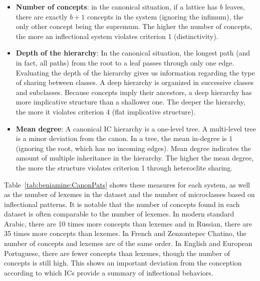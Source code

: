 \documentclass[output=paper]{langscibook}
\begin{document}
    \begin{itemize}
        \item \textbf{Number of concepts}: in the canonical situation, if a lattice has $b$ leaves, there are exactly $b+1$ concepts in the system (ignoring the infimum), the only other concept being the supremum. The higher the number of concepts, the more an inflectional system violates criterion 1 (distinctivity).
        \item \textbf{Depth of the hierarchy}: In the canonical situation, the longest path (and in fact, all paths) from the root to a leaf passes through only one edge. Evaluating the depth of the hierarchy gives us information regarding the type of sharing between classes. A deep hierarchy is organized in successive classes and subclasses. Because concepts imply their ancestors, a deep hierarchy has more implicative structure than a shallower one. The deeper the hierarchy, the more it violates criterion 4 (flat implicative structure). 
        \item \textbf{Mean degree}: A canonical IC hierarchy is a one-level tree. A multi-level tree is a minor deviation from the canon. In a tree, the mean in-degree is $1$ (ignoring the root, which has no incoming edges). Mean degree indicates the amount of multiple inheritance in the hierarchy. The higher the mean degree, the more the structure violates criterion 1 through heteroclite sharing.
    \end{itemize}
    
    Table~\ref{tab:beniamine:CanonPats} shows these measures for each system, as well as the number of lexemes in the dataset and the number of microclasses based on inflectional patterns. It is notable that the number of concepts found in each dataset is often comparable to the number of lexemes. In modern standard Arabic, there are 10 times more concepts than lexemes and in Russian, there are 35 times more concepts than lexemes. In French and Zenzontepec Chatino, the number of concepts and lexemes are of the same order. In English and European Portuguese, there are fewer concepts than lexemes, though the number of concepts is still high. This shows an important deviation from the conception according to which ICs provide a summary of inflectional behaviors.
     
\end{document}
